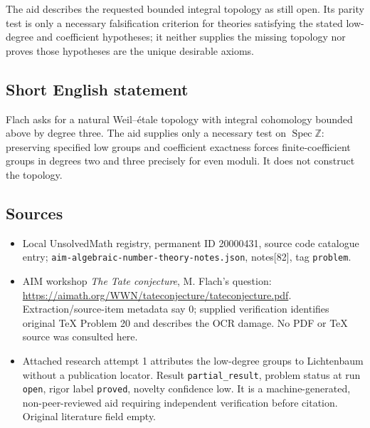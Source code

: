 \documentclass[11pt]{article}
\newcommand{\Z}{\mathbb{Z}}
\begin{document}
The aid describes the requested bounded integral topology as still open. Its parity test is only a necessary falsification criterion for theories satisfying the stated low-degree and coefficient hypotheses; it neither supplies the missing topology nor proves those hypotheses are the unique desirable axioms.
\subsection{Short English statement}
Flach asks for a natural Weil--étale topology with integral cohomology bounded above by degree three. The aid supplies only a necessary test on $\operatorname{Spec}\Z$: preserving specified low groups and coefficient exactness forces finite-coefficient groups in degrees two and three precisely for even moduli. It does not construct the topology.
\subsection{Sources}
\begin{itemize}
\item Local UnsolvedMath registry, permanent ID 20000431, source code catalogue entry; \texttt{aim-algebraic-number-theory-notes.json}, notes[82], tag \texttt{problem}.
\item AIM workshop \emph{The Tate conjecture}, M. Flach's question: \url{https://aimath.org/WWN/tateconjecture/tateconjecture.pdf}. Extraction/source-item metadata say 0; supplied verification identifies original TeX Problem 20 and describes the OCR damage. No PDF or TeX source was consulted here.
\item Attached research attempt 1 attributes the low-degree groups to Lichtenbaum without a publication locator. Result \texttt{partial\_result}, problem status at run \texttt{open}, rigor label \texttt{proved}, novelty confidence low. It is a machine-generated, non-peer-reviewed aid requiring independent verification before citation. Original literature field empty.
\end{itemize}
\end{document}
